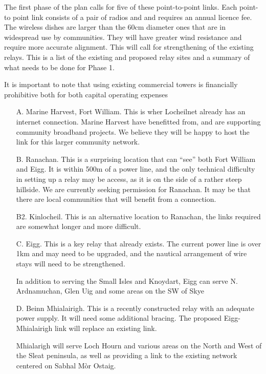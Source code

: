 The first phase of the plan calls for five of these point-to-point
links. Each point-to point link consists of a pair of radios and and
requires an annual licence fee.  The wireless dishes are larger than
the 60cm diameter ones that are in widespread use by communities. They
will have greater wind resistance and require more accurate
alignment.  This will call for strengthening of the existing relays.
This is a list of the existing and proposed relay sites and a summary
of what needs to be done for Phase 1.

It is important to note that using existing commercial towers is
financially prohibitive both for both capital operating expenses

\begin{itemize}
\item[A.] Marine Harvest, Fort William.  This is wher Locheilnet
  already has an internet connection.  Marine Harvest have benefitted
  from, and are supporting community broadband projects.  We believe
  they will be happy to host the link for this larger community
  network.

\item[B.] Ranachan.  This is a surprising location that can ``see''
  both Fort William and Eigg.  It is within 500m of a power line, and
  the only technical difficulty in setting up a relay may be
  access, as it is on the side of a rather steep hillside. We are
  currently seeking permission for Ranachan.  It may be that there are
  local communities that will benefit from a connection.

\item[B2.] Kinlocheil. This is an alternative location to Ranachan,
  the links required are somewhat longer and more difficult.

\item[C.] Eigg.  This is a key relay that already exists.  The current
  power line is over 1km and may need to be upgraded, and the nautical
  arrangement of wire stays will need to be strengthened.

  In addition to serving the Small Isles and Knoydart, Eigg can serve
  N. Ardnamuchan, Glen Uig and some areas on the SW of Skye

\item[D.] Beinn Mhialairigh.  This is a recently constructed relay
  with an adequate power supply.  It will need some additional
  bracing.  The proposed Eigg-Mhialairigh link will replace an
  existing link.

  Mhialarigh will serve Loch Hourn and various areas on the North and
  West of the Sleat peninsula, as well
  as providing a link to the existing network centered on Sabhal M\`or Ostaig.


\end{itemize}
